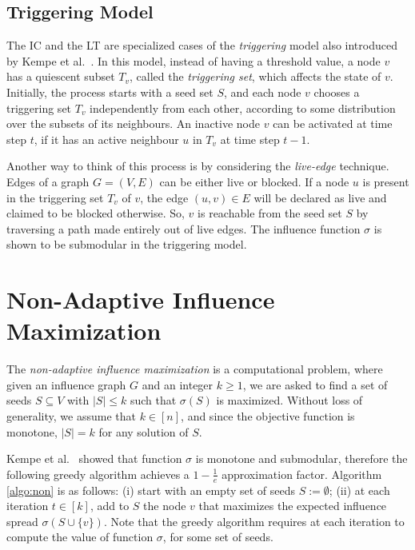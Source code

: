 \subsection{Triggering Model}

The IC and the LT are specialized cases of the \emph{triggering} model also introduced by Kempe et al.~\cite{Kempe2015}. In this model, instead of having a threshold value, a node $v$ has a quiescent subset $T_v$, called the \emph{triggering set}, which affects the state of $v$. Initially, the process starts with a seed set $S$, and each node $v$ chooses a triggering set $T_v$ independently from each other, according to some distribution over the subsets of its neighbours. An inactive node $v$ can be activated at time step $t$, if it has an active neighbour $u$ in $T_v$ at time step $t-1$.

Another way to think of this process is by considering the \emph{live-edge} technique. Edges of a graph $G=(V, E)$ can be either {live} or {blocked}. If a node $u$ is present in the triggering set $T_v$ of $v$, the edge $(u,v) \in E$ will be declared as live and claimed to be blocked otherwise. So, $v$ is reachable from the seed set $S$ by traversing a path made entirely out of live edges. The influence function $\sigma$ is shown to be submodular in the triggering model. 





\section{Non-Adaptive Influence Maximization}\label{nonada_sec}



The {\em non-adaptive influence maximization} is a computational problem, where given an influence graph $G$ and an integer $k\geq 1$, we are asked to find a set of seeds $S\subseteq V$ with $|S|\leq k$ such that $\sigma(S)$ is maximized. Without loss of generality, we assume that $k\in [n]$, and since the objective function is monotone, $|S|=k$ for any solution of $S$.

Kempe et al.~\cite{Kempe2003,Kempe2015} showed that function $\sigma$ is monotone and submodular, therefore the following greedy algorithm achieves a $1-\frac{1}{e}$ approximation factor. Algorithm \ref{algo:non} is as follows: (i) start with an empty set of seeds $S:=\emptyset$; (ii) at each iteration $t\in [k]$, add to $S$ the node $v$ that maximizes the expected influence spread $\sigma(S\cup \{v\})$. Note that the greedy algorithm requires at each iteration to compute the value of function $\sigma$, for some set of seeds.



